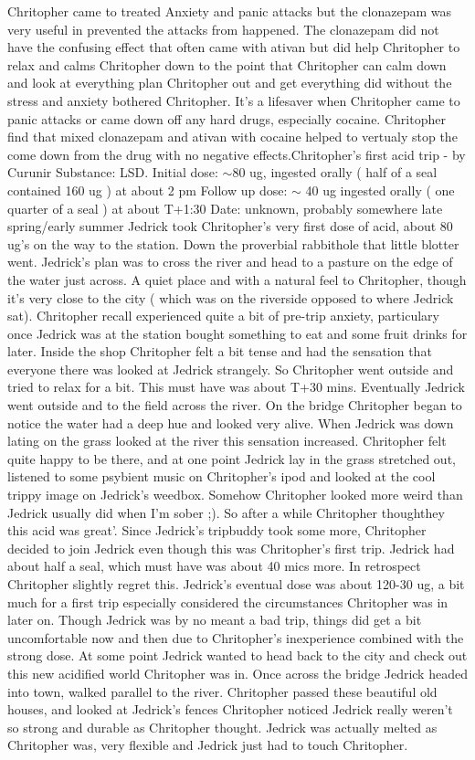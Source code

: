 \documentclass[12pt]{book}
\begin{document}
Chritopher came to treated Anxiety and panic attacks but the clonazepam was very useful in prevented the attacks from happened. The clonazepam did not have the confusing effect that often came with ativan but did help Chritopher to relax and calms Chritopher down to the point that Chritopher can calm down and look at everything plan Chritopher out and get everything did without the stress and anxiety bothered Chritopher. It's a lifesaver when Chritopher came to panic attacks or came down off any hard drugs, especially cocaine. Chritopher find that mixed clonazepam and ativan with cocaine helped to vertualy stop the come down from the drug with no negative effects.Chritopher's first acid trip - by Curunir Substance: LSD. Initial dose: $\sim$80 ug, ingested orally ( half of a seal contained 160 ug ) at about 2 pm Follow up dose: $\sim$ 40 ug ingested orally ( one quarter of a seal ) at about T+1:30 Date: unknown, probably somewhere late spring/early summer Jedrick took Chritopher's very first dose of acid, about 80 ug's on the way to the station. Down the proverbial rabbithole that little blotter went. Jedrick's plan was to cross the river and head to a pasture on the edge of the water just across. A quiet place and with a natural feel to Chritopher, though it's very close to the city ( which was on the riverside opposed to where Jedrick sat). Chritopher recall experienced quite a bit of pre-trip anxiety, particulary once Jedrick was at the station bought something to eat and some fruit drinks for later. Inside the shop Chritopher felt a bit tense and had the sensation that everyone there was looked at Jedrick strangely. So Chritopher went outside and tried to relax for a bit. This must have was about T+30 mins. Eventually Jedrick went outside and to the field across the river. On the bridge Chritopher began to notice the water had a deep hue and looked very alive. When Jedrick was down lating on the grass looked at the river this sensation increased. Chritopher felt quite happy to be there, and at one point Jedrick lay in the grass stretched out, listened to some psybient music on Chritopher's ipod and looked at the cool trippy image on Jedrick's weedbox. Somehow Chritopher looked more weird than Jedrick usually did when I'm sober ;). So after a while Chritopher thoughthey this acid was great'. Since Jedrick's tripbuddy took some more, Chritopher decided to join Jedrick even though this was Chritopher's first trip. Jedrick had about half a seal, which must have was about 40 mics more. In retrospect Chritopher slightly regret this. Jedrick's eventual dose was about 120-30 ug, a bit much for a first trip especially considered the circumstances Chritopher was in later on. Though Jedrick was by no meant a bad trip, things did get a bit uncomfortable now and then due to Chritopher's inexperience combined with the strong dose. At some point Jedrick wanted to head back to the city and check out this new acidified world Chritopher was in. Once across the bridge Jedrick headed into town, walked parallel to the river. Chritopher passed these beautiful old houses, and looked at Jedrick's fences Chritopher noticed Jedrick really weren't so strong and durable as Chritopher thought. Jedrick was actually melted as Chritopher was, very flexible and Jedrick just had to touch Chritopher. 
\end{document}
